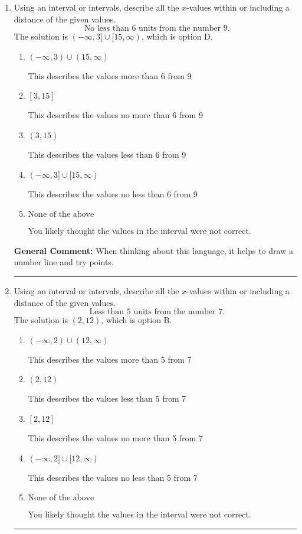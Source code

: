 \documentclass{extbook}[14pt]
\newcommand{\litem}[1]{\item #1

\rule{\textwidth}{0.4pt}}
\begin{document}
\begin{enumerate}\litem{
Using an interval or intervals, describe all the $x$-values within or including a distance of the given values.
\[ \text{ No less than } 6 \text{ units from the number } 9. \]The solution is \( (-\infty, 3] \cup [15, \infty) \), which is option D.\begin{enumerate}[label=\Alph*.]
\item \( (-\infty, 3) \cup (15, \infty) \)

This describes the values more than 6 from 9
\item \( [3, 15] \)

This describes the values no more than 6 from 9
\item \( (3, 15) \)

This describes the values less than 6 from 9
\item \( (-\infty, 3] \cup [15, \infty) \)

This describes the values no less than 6 from 9
\item \( \text{None of the above} \)

You likely thought the values in the interval were not correct.
\end{enumerate}

\textbf{General Comment:} When thinking about this language, it helps to draw a number line and try points.
}
\litem{
Using an interval or intervals, describe all the $x$-values within or including a distance of the given values.
\[ \text{ Less than } 5 \text{ units from the number } 7. \]The solution is \( (2, 12) \), which is option B.\begin{enumerate}[label=\Alph*.]
\item \( (-\infty, 2) \cup (12, \infty) \)

This describes the values more than 5 from 7
\item \( (2, 12) \)

This describes the values less than 5 from 7
\item \( [2, 12] \)

This describes the values no more than 5 from 7
\item \( (-\infty, 2] \cup [12, \infty) \)

This describes the values no less than 5 from 7
\item \( \text{None of the above} \)

You likely thought the values in the interval were not correct.
\end{enumerate}

}
\end{enumerate}
\end{document}
